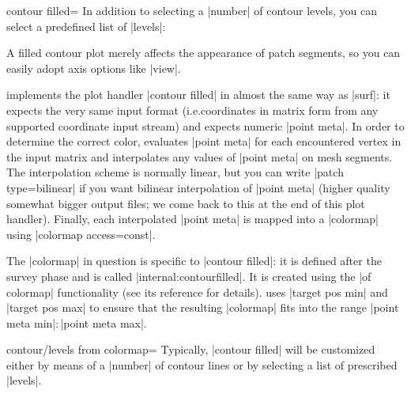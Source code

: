 {{\begin{plottype}[/pgfplots]{
    contour filled=\textcolor{black}{}%
}
    In addition to selecting a |number| of contour levels, you can select a
    predefined list of |levels|:
\pgfplotsexpensiveexample
\begin{codeexample}[]
\end{codeexample}
    A filled contour plot merely affects the appearance of patch segments, so
    you can easily adopt axis options like |view|.

    \PGFPlots{} implements the plot handler |contour filled| in almost the same
    way as |surf|: it expects the very same input format (i.e.\@ coordinates in
    matrix form from any supported coordinate input stream) and expects numeric
    |point meta|. In order to determine the correct color, \PGFPlots{}
    evaluates |point meta| for each encountered vertex in the input matrix and
    interpolates any values of |point meta| on mesh segments. The interpolation
    scheme is normally linear, but you can write |patch type=bilinear| if you
    want bilinear interpolation of |point meta| (higher quality somewhat bigger
    output files; we come back to this at the end of this plot handler).
    Finally, each interpolated |point meta| is mapped into a |colormap| using
    |colormap access=const|.

    The |colormap| in question is specific to |contour filled|: it is defined
    after the survey phase and is called |internal:contourfilled|. It is
    created using the |of colormap| functionality (see its reference for
    details). \PGFPlots{} uses |target pos min| and |target pos max| to ensure
    that the resulting |colormap| fits into the range
    |point meta min|$:$|point meta max|.

    \begin{pgfplotskey}{contour/levels from colormap=}
        Typically, |contour filled| will be customized either by means of a
        |number| of contour lines or by selecting a list of prescribed
        |levels|.


\end{pgfplotskey}
\end{plottype}}}
